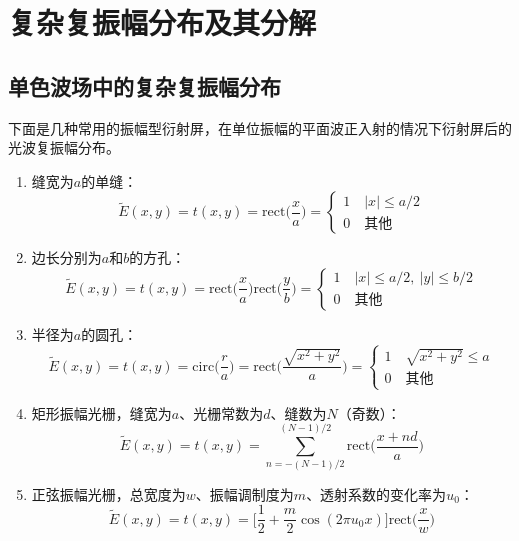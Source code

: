 \documentclass[cn,10pt,chinesefont=founder,math=mtpro2,cite=super,toc=onecol,twoside]{elegantbook}
\begin{document}
\section{复杂复振幅分布及其分解}

\subsection{单色波场中的复杂复振幅分布}

下面是几种常用的振幅型衍射屏，在单位振幅的平面波正入射的情况下衍射屏后的光波复振幅分布。
\begin{enumerate}
	\item 缝宽为$a$的单缝：
		\begin{equation}
		\tilde{E}(x,y)=t(x,y)=\mathrm{rect}\bigg(\frac{x}{a}\bigg)=
		\begin{cases}
		1\quad |x|\leqslant a/2\\
		0\quad \text{其他}
		\end{cases}
		\end{equation}
	\item 边长分别为$a$和$b$的方孔：
		\begin{equation}
		\tilde{E}(x,y)=t(x,y)=\mathrm{rect}\bigg(\frac{x}{a}\bigg)\mathrm{rect}\bigg(\frac{y}{b}\bigg)=
		\begin{cases}
		1\quad |x|\leqslant a/2,\ |y|\leqslant b/2\\
		0\quad \text{其他}
		\end{cases}
		\end{equation}
	\item 半径为$a$的圆孔：
		\begin{equation}
		\tilde{E}(x,y)=t(x,y)=\mathrm{circ}\bigg(\frac{r}{a}\bigg)=\mathrm{rect}\Bigg(\frac{\sqrt{x^2+y^2}}{a}\Bigg)=
		\begin{cases}
		1\quad \sqrt{x^2+y^2}\leqslant a\\
		0\quad \text{其他}
		\end{cases}
		\end{equation}
	\item 矩形振幅光栅，缝宽为$a$、光栅常数为$d$、缝数为$N$（奇数）：
		\begin{equation}
		\tilde{E}(x,y)=t(x,y)=\sum_{n=-(N-1)/2}^{(N-1)/2}\mathrm{rect}\bigg(\frac{x+nd}{a}\bigg)
		\end{equation}
	\item 正弦振幅光栅，总宽度为$w$、振幅调制度为$m$、透射系数的变化率为$u_0$：
		\begin{equation}
		\tilde{E}(x,y)=t(x,y)=\bigg[\frac{1}{2}+\frac{m}{2}\cos(2\pi u_0x)\bigg]\mathrm{rect}\bigg(\frac{x}{w}\bigg)
		\end{equation}
\end{enumerate}
\end{document}
